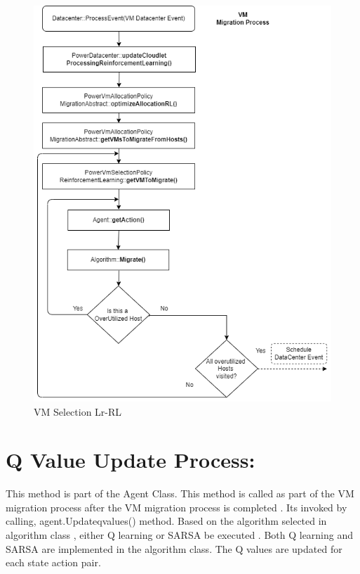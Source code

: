 \documentclass[a4paper,12pt]{Classes/RoboticsLaTeX}
\begin{document}
       \begin{figure}[H]
           \centering
           \includegraphics[width=1.0\linewidth]{Figures/VM selection Process.png}
           \caption{VM Selection Lr-RL}
           \label{fig:enter-label}
       \end{figure}

       
       \section{Q Value Update Process:}
       This method is part of the Agent Class. This method is called  as part of the VM migration process after the VM migration process  is completed .
       Its invoked by calling, agent.Updateqvalues() method. Based on the algorithm selected in algorithm class , either Q learning or SARSA be executed . Both Q learning and SARSA are  implemented in the algorithm class. The Q values are updated for each state action pair.
\end{document}
